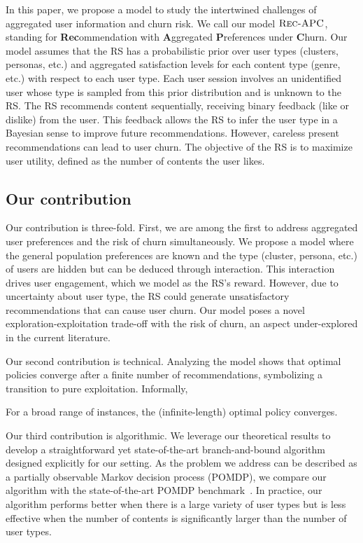 In this paper, we propose a model to study the intertwined challenges of aggregated user information and churn risk. We call our model $\textsc{Rec-APC}$, standing for \textbf{Rec}ommendation with \textbf{A}ggregated \textbf{P}references under \textbf{C}hurn. Our model assumes that the RS has a probabilistic prior over user types (clusters, personas, etc.) and aggregated satisfaction levels for each content type (genre, etc.) with respect to each user type. Each user session involves an unidentified user whose type is sampled from this prior distribution and is unknown to the RS. The RS recommends content sequentially, receiving binary feedback (like or dislike) from the user. This feedback allows the RS to infer the user type in a Bayesian sense to improve future recommendations. However, careless present recommendations can lead to user churn. The objective of the RS is to maximize user utility, defined as the number of contents the user likes.

\subsection{Our contribution}
Our contribution is three-fold. First, we are among the first to address aggregated user preferences and the risk of churn simultaneously. We propose a model where the general population preferences are known and the type (cluster, persona, etc.) of users are hidden but can be deduced through interaction. This interaction drives user engagement, which we model as the RS's reward. However, due to uncertainty about user type, the RS could generate unsatisfactory recommendations that can cause user churn. Our model poses a novel exploration-exploitation trade-off with the risk of churn, an aspect under-explored in the current literature.

Our second contribution is technical. Analyzing the model shows that optimal policies converge after a finite number of recommendations, symbolizing a transition to pure exploitation. Informally,
\begin{theorem}
For a broad range of instances, the (infinite-length) optimal policy converges.
\end{theorem}

Our third contribution is algorithmic. We leverage our theoretical results to develop a straightforward yet state-of-the-art branch-and-bound algorithm designed explicitly for our setting. As the problem we address can be described as a partially observable Markov decision process (POMDP), we compare our algorithm with the state-of-the-art POMDP benchmark~\cite{kurniawati2009sarsop}. In practice, our algorithm performs better when there is a large variety of user types but is less effective when the number of contents is significantly larger than the number of user types.

